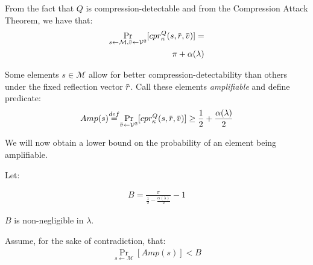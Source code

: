 \documentclass[conference, letterpaper, 10pt]{IEEEtran}
\newcommand\defeq{\stackrel{\mathclap{\normalfont\mbox{def}}}{=}}
\newcommand{\overbar}[1]{\mkern 1.5mu\overline{\mkern-1.5mu#1\mkern-1.5mu}\mkern 1.5mu}
\begin{document}
\begin{IEEEproof}

From the fact that $Q$ is compression-detectable and from the Compression Attack Theorem, we have that:
\begin{align*}
    \Pr_{s \leftarrow \mathcal{M},
         \overbar{v} \leftarrow \mathcal{V}^2}
         [cpr^Q_{\kappa}(s, \overbar{r}, \overbar{v})]
    =\\
    \pi + \alpha(\lambda)
\end{align*}

Some elements $s \in \mathcal{M}$ allow for better compression-detectability than others under the fixed
reflection vector $\overbar{r}$. Call these elements \textit{amplifiable} and define predicate:
\begin{align*}
    Amp(s) \defeq
    \Pr_{\overbar{v} \leftarrow \mathcal{V}^2}
    [cpr^Q_{\kappa}
     (s, \overbar{r}, \overbar{v})]
    \geq
    \frac{1}{2} + \frac{\alpha(\lambda)}{2}
\end{align*}

We will now obtain a lower bound on the probability of an element being amplifiable.

Let:

\begin{align*}
    B = \frac{\pi}{\frac{1}{2} - \frac{\alpha(\lambda)}{2}} - 1
\end{align*}

$B$ is non-negligible in $\lambda$.

Assume, for the sake of contradiction, that:
\begin{align*}
    \Pr_{s \leftarrow \mathcal{M}}
    [Amp(s)] < B
\end{align*}


\end{IEEEproof}
\end{document}
